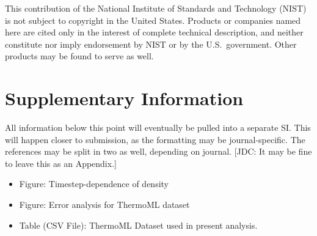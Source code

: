 \documentclass[aps,pre,twocolumn,nofootinbib,superscriptaddress,linenumbers]{revtex4-1}
\begin{document}
This contribution of the National Institute of Standards and Technology (NIST) is not subject to copyright in the United States.  
Products or companies named here are cited only in the interest of complete technical description, and neither constitute nor imply endorsement by NIST or by the U.S.~government.  
Other products may be found to serve as well.

\clearpage

\appendix 

\section{Supplementary Information}

All information below this point will eventually be pulled into a separate SI.  
This will happen closer to submission, as the formatting may be journal-specific.  
The references may be split in two as well, depending on journal.
{\color{red}[JDC: It may be fine to leave this as an Appendix.]}

\begin{itemize}
 \item Figure: Timestep-dependence of density
 \item Figure: Error analysis for ThermoML dataset
 \item Table (CSV File): ThermoML Dataset used in present analysis.
\end{itemize}

\clearpage
\end{document}
